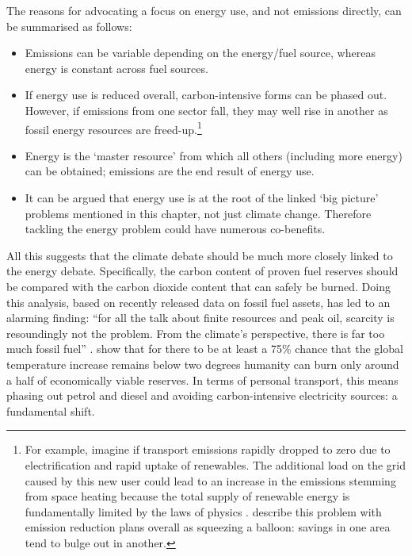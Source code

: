 \documentclass[a4paper, 11pt, twoside]{Thesis}
\begin{document}
The reasons for advocating a focus on energy use,
and not emissions directly, can be summarised as follows:
\begin{itemize}
 \item Emissions can be variable depending on the energy/fuel source, whereas
 energy is constant across fuel sources.
 \item If energy use is reduced overall, carbon-intensive forms can be phased out.
However, if emissions from one sector fall, they may well rise in another as
fossil energy resources are freed-up.\footnote{For
example, imagine if transport emissions rapidly dropped to zero
due to electrification and rapid uptake of renewables. The additional
load on the grid caused by this new user \citep{dyke2010impact} could
lead to an increase in the emissions stemming from space heating because
the total supply of renewable energy is fundamentally
limited by the laws of physics \citep{MacKay2009}. \citet{Berners-Lee2013}
describe this problem with emission reduction plans overall as squeezing
a balloon: savings in one area tend to bulge out in another.}
 \item Energy is the `master resource' from which all others (including more
energy) can be obtained; emissions are the end result of energy use.
 \item It can be argued that energy use is at the root of the linked `big picture'
problems mentioned in this chapter, not just climate change. Therefore
tackling the energy problem could have numerous co-benefits.
\end{itemize}
All this suggests that the climate debate should be much more closely
linked to the energy debate. Specifically, the carbon content of proven
fuel reserves should be compared with the carbon dioxide content that
can safely be burned. Doing this analysis, based on recently released
data on fossil fuel assets, has led to an alarming finding: ``for all the
talk about finite resources and peak oil, scarcity is resoundingly not the
problem. From the climate's perspective, there is far too much fossil fuel''
\citep[p.~29]{Berners-Lee2013}.
\citet{Berners-Lee2013} show that for there to be at least a 75\% chance
that the global temperature increase remains below two degrees humanity can
burn only around a half of economically viable reserves.
In terms of personal transport, this means
phasing out petrol and diesel and avoiding carbon-intensive electricity sources:
a fundamental shift.
\end{document}
